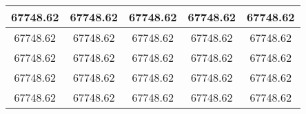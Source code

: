 \begin{large}\begin{tabular}{|c|c|c|c|c|}
\hline
67748.62&67748.62&67748.62&67748.62&67748.62\\\hline
67748.62&67748.62&67748.62&67748.62&67748.62\\\hline
67748.62&67748.62&67748.62&67748.62&67748.62\\\hline
67748.62&67748.62&67748.62&67748.62&67748.62\\\hline
67748.62&67748.62&67748.62&67748.62&67748.62\\\hline
\end{tabular}
\end{large}